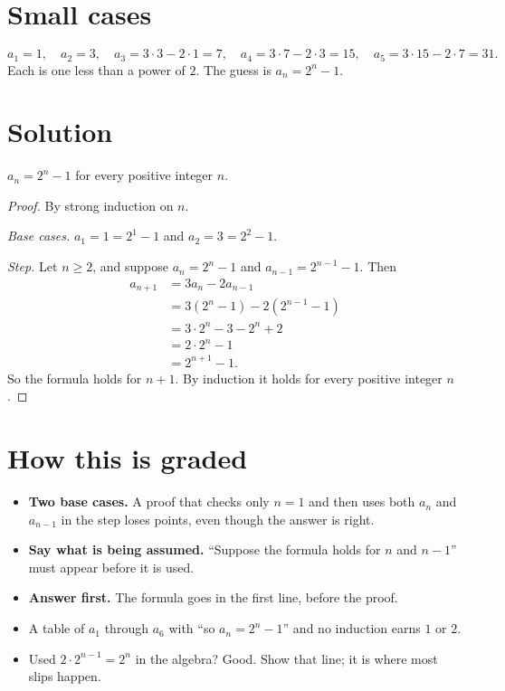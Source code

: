 \documentclass[11pt]{article}
\begin{document}
\section*{Small cases}
\[ a_1 = 1, \quad a_2 = 3, \quad a_3 = 3 \cdot 3 - 2 \cdot 1 = 7, \quad a_4 = 3 \cdot 7 - 2 \cdot 3 = 15, \quad a_5 = 3 \cdot 15 - 2 \cdot 7 = 31. \]
Each is one less than a power of $2$. The guess is $a_n = 2^n - 1$.

\section*{Solution}
\begin{answer}
$a_n = 2^n - 1$ for every positive integer $n$.
\end{answer}
\begin{proof}
By strong induction on $n$.

\emph{Base cases.} $a_1 = 1 = 2^1 - 1$ and $a_2 = 3 = 2^2 - 1$.

\emph{Step.} Let $n \ge 2$, and suppose $a_n = 2^n - 1$ and $a_{n-1} = 2^{n-1} - 1$. Then
\begin{align*}
a_{n+1} &= 3a_n - 2a_{n-1} \\
        &= 3(2^n - 1) - 2(2^{n-1} - 1) \\
        &= 3 \cdot 2^n - 3 - 2^n + 2 \\
        &= 2 \cdot 2^n - 1 \\
        &= 2^{n+1} - 1.
\end{align*}
So the formula holds for $n + 1$. By induction it holds for every positive integer $n$.
\end{proof}

\section*{How this is graded}
\begin{itemize}
  \item \textbf{Two base cases.} A proof that checks only $n = 1$ and then uses both $a_n$ and $a_{n-1}$ in the step loses points, even though the answer is right.
  \item \textbf{Say what is being assumed.} ``Suppose the formula holds for $n$ and $n - 1$'' must appear before it is used.
  \item \textbf{Answer first.} The formula goes in the first line, before the proof.
  \item A table of $a_1$ through $a_6$ with ``so $a_n = 2^n - 1$'' and no induction earns $1$ or $2$.
  \item Used $2 \cdot 2^{n-1} = 2^n$ in the algebra? Good. Show that line; it is where most slips happen.
\end{itemize}
\end{document}
